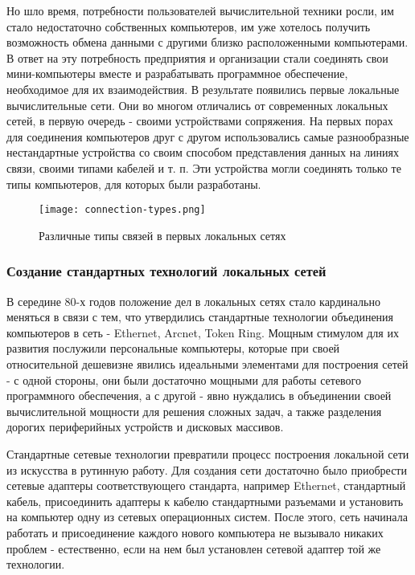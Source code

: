 Но шло время, потребности пользователей вычислительной техники росли, им стало недостаточно собственных компьютеров, им уже хотелось получить возможность обмена данными с другими близко расположенными компьютерами.
В ответ на эту потребность предприятия и организации стали соединять свои мини-компьютеры вместе и разрабатывать программное обеспечение, необходимое для их взаимодействия.
В результате появились первые локальные вычислительные сети.
Они во многом отличались от современных локальных сетей, в первую очередь - своими устройствами сопряжения.
На первых порах для соединения компьютеров друг с другом использовались самые разнообразные нестандартные устройства со своим способом представления данных на линиях связи, своими типами кабелей и т. п.
Эти устройства могли соединять только те типы компьютеров, для которых были разработаны.

\begin{figure}[!ht]
    \centering
    \texttt{[image: connection-types.png]}
    \caption{Различные типы связей в первых локальных сетях}
    \label{fig:connection-types}
\end{figure}

\subsubsection{Создание стандартных технологий локальных сетей}

В середине 80-х годов положение дел в локальных сетях стало кардинально меняться в связи с тем, что утвердились стандартные технологии объединения компьютеров в сеть - Ethernet, Arcnet, Token Ring.
Мощным стимулом для их развития послужили персональные компьютеры, которые при своей относительной дешевизне явились идеальными элементами для построения сетей - с одной стороны, они были достаточно мощными для работы сетевого программного обеспечения, а с другой - явно нуждались в объединении своей вычислительной мощности для решения сложных задач, а также разделения дорогих периферийных устройств и дисковых массивов.

Стандартные сетевые технологии превратили процесс построения локальной сети из искусства в рутинную работу.
Для создания сети достаточно было приобрести сетевые адаптеры соответствующего стандарта, например Ethernet, стандартный кабель, присоединить адаптеры к кабелю стандартными разъемами и установить на компьютер одну из сетевых операционных систем.
После этого, сеть начинала работать и присоединение каждого нового компьютера не вызывало никаких проблем - естественно, если на нем был установлен сетевой адаптер той же технологии.

